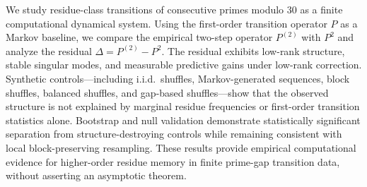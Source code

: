 We study residue-class transitions of consecutive primes modulo $30$ as a finite computational dynamical system. Using the first-order transition operator $P$ as a Markov baseline, we compare the empirical two-step operator $P^{(2)}$ with $P^2$ and analyze the residual $\Delta = P^{(2)} - P^2$. The residual exhibits low-rank structure, stable singular modes, and measurable predictive gains under low-rank correction. Synthetic controls---including i.i.d.\ shuffles, Markov-generated sequences, block shuffles, balanced shuffles, and gap-based shuffles---show that the observed structure is not explained by marginal residue frequencies or first-order transition statistics alone. Bootstrap and null validation demonstrate statistically significant separation from structure-destroying controls while remaining consistent with local block-preserving resampling. These results provide empirical computational evidence for higher-order residue memory in finite prime-gap transition data, without asserting an asymptotic theorem.
